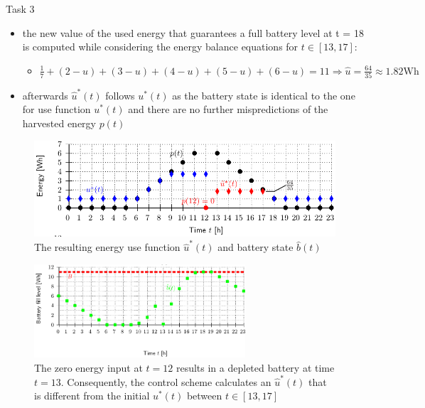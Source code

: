 \begin{frame}[allowframebreaks]{Task 3}{}
\begin{solutionnoinc}
\begin{itemize}
      \item the new value of the used energy that guarantees a full battery level at t = 18 is computed while considering the energy balance equations for $t\in [13, 17]$:
      \begin{itemize}
        \item $\frac{1}{7}+(2-u)+(3-u)+(4-u)+(5-u)+(6-u)=11 \Rightarrow \hat{u}=\frac{64}{35} \approx 1.82 \mathrm{Wh}$
      \end{itemize}
      \item afterwards $\hat u^*(t)$ follows $u^*(t)$ as the battery state is identical to the one for use function $u^*(t)$ and there are no further mispredictions of the harvested energy $p(t)$
    \end{itemize}
  \end{solutionnoinc}
  \framebreak
  \begin{solutionnoinc}
    \begin{figure}
      \centering
      \includegraphics[width=\textwidth]{./figures/task5_use_and_harvest.png}
      \caption{The resulting energy use function $\hat u^*(t)$ and battery state $\hat b(t)$}
    \end{figure}
  \end{solutionnoinc}
  \begin{solutionnoinc}
    \begin{figure}
      \centering
      \includegraphics[width=0.7\textwidth]{./figures/task5_battery.png}
      \caption{The zero energy input at $t = 12$ results in a depleted battery at time $t = 13$. Consequently, the control scheme calculates an $\hat u^*(t)$ that is different from the initial $u^*(t)$ between $t \in [13, 17]$}
    \end{figure}
  \end{solutionnoinc}
\end{frame}
